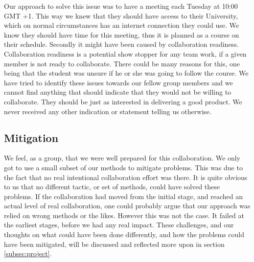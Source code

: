 Our approach to solve this issue was to have a meeting each Tuesday at 10:00 GMT +1. This way we knew that they should have access to their University, which on normal circumstances has an internet connection they could use. We know they should have time for this meeting, thus it is planned as a course on their schedule. Secondly it might have been caused by collaboration readiness. Collaboration readiness is a potential show stopper for any team work, if a given member is not ready to collaborate. There could be many reasons for this, one being that the student was unsure if he or she was going to follow the course. We have tried to identify these issues towards our fellow group members and we cannot find anything that should indicate that they would not be willing to collaborate. They should be just as interested in delivering a good product. We never received any other indication or statement telling us otherwise.

\subsection{Mitigation} \label{sec:mitigation}
We feel, as a group, that we were well prepared for this collaboration. We only got to use a small subset of our methods to mitigate problems. This was due to the fact that no real intentional collaboration effort was there. It is quite obvious to us that no different tactic, or set of methods, could have solved these problems. If the collaboration had moved from the initial stage, and reached an actual level of real collaboration, one could probably argue that our approach was relied on wrong methods or the likes. However this was not the case. It failed at the earliest stages, before we had any real impact. These challenges, and our thoughts on what could have been done differently, and how the problems could have been mitigated, will be discussed and reflected more upon in section \ref{subsec:project}.